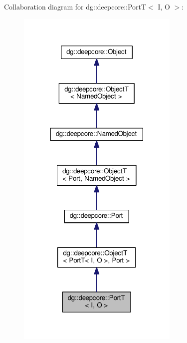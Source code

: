 Collaboration diagram for dg\+:\+:deepcore\+:\+:PortT$<$ I, O $>$\+:
\nopagebreak
\begin{figure}[H]
\begin{center}
\leavevmode
\includegraphics[width=219pt]{structdg_1_1deepcore_1_1_port_t__coll__graph}
\end{center}
\end{figure}
